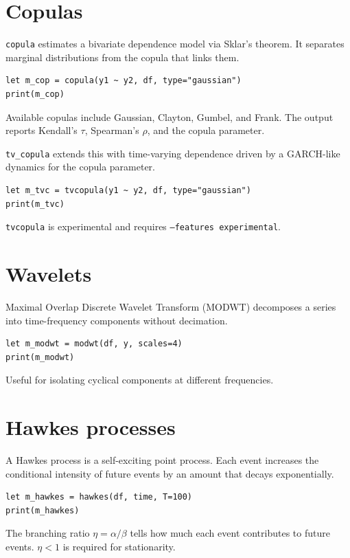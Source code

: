 \section{Copulas}

\texttt{copula} estimates a bivariate dependence model via Sklar's theorem. It
separates marginal distributions from the copula that links them.

\begin{lstlisting}[caption={Copula}]
let m_cop = copula(y1 ~ y2, df, type="gaussian")
print(m_cop)
\end{lstlisting}

Available copulas include Gaussian, Clayton, Gumbel, and Frank. The
output reports Kendall's $\tau$, Spearman's $\rho$, and the copula
parameter.

\texttt{tv\_copula} extends this with time-varying dependence driven by a
GARCH-like dynamics for the copula parameter.

\begin{lstlisting}[caption={Time-varying copula}]
let m_tvc = tvcopula(y1 ~ y2, df, type="gaussian")
print(m_tvc)
\end{lstlisting}

\texttt{tvcopula} is experimental and requires \texttt{--features experimental}.

\section{Wavelets}

Maximal Overlap Discrete Wavelet Transform (MODWT) decomposes a series
into time-frequency components without decimation.

\begin{lstlisting}[caption={MODWT}]
let m_modwt = modwt(df, y, scales=4)
print(m_modwt)
\end{lstlisting}

Useful for isolating cyclical components at different frequencies.

\section{Hawkes processes}

A Hawkes process is a self-exciting point process. Each event increases
the conditional intensity of future events by an amount that decays
exponentially.

\begin{lstlisting}[caption={Hawkes process}]
let m_hawkes = hawkes(df, time, T=100)
print(m_hawkes)
\end{lstlisting}

The branching ratio $\eta = \alpha / \beta$ tells how much each event
contributes to future events. $\eta < 1$ is required for stationarity.
